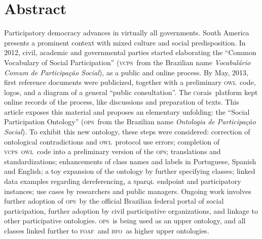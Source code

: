 \documentclass[10pt,letterpaper]{article}
\newcommand{\ops}{\textsc{ops}}
\newcommand{\vcps}{\textsc{vcps}}
\newcommand{\owl}{\textsc{owl}}
\newcommand{\sparql}{\textsc{s}par\textsc{ql}}
\newcommand{\bfo}{\textsc{bfo}}
\newcommand{\foaf}{\textsc{foaf}}
\newcommand{\corais}{\textsc{c}orais}
\begin{document}
\section*{Abstract}
    Participatory democracy advances in virtually all governments. South America presents a prominent context with mixed culture and social predisposition. In 2012, civil, academic and governmental parties started elaborating the ``Common Vocabulary of Social Participation'' (\vcps\ from the Brazilian name \emph{Vocabul\'ario Comum de Participa\c{c}\~ao Social}), as a public and online process. By May, 2013, first reference documents were publicized, together with a preliminary \owl\ code,
logos, and a diagram of a general ``public consultation''.
The \corais\ platform kept online records of the process, like discussions and preparation of texts. 
This article exposes this material and proposes an elementary unfolding: the ``Social Participation Ontology'' (\ops\ from the Brazilian name \emph{Ontologia de Participa\c{c}\~ao Social}). To exhibit this new ontology, these steps were considered: correction of ontological contradictions and \owl\ protocol use errors; completion of \vcps\ \owl\ code into a preliminary version of the \ops; translations and standardizations; enhancements of class names and labels in Portuguese, Spanish and English; a toy expansion of the ontology by further specifying classes; linked data examples regarding dereferencing, a \sparql\ endpoint and participatory instances; use cases by researchers and public managers. Ongoing work involves further adoption of \ops\ by the official Brazilian federal portal of social participation, further adoption by civil participative organizations, and linkage to other participative ontologies. \ops\ is being used as an upper ontology, and all classes linked further to \foaf\ and \bfo\ as higher upper ontologies.



%
\linenumbers
\end{document}
